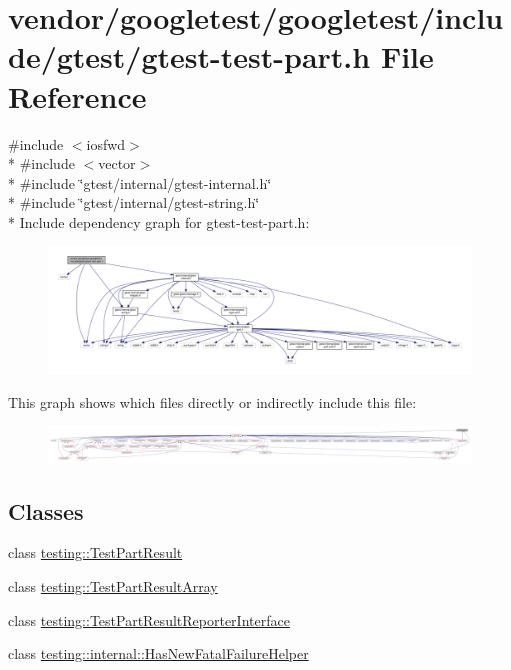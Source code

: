 \hypertarget{gtest-test-part_8h}{}\section{vendor/googletest/googletest/include/gtest/gtest-\/test-\/part.h File Reference}
\label{gtest-test-part_8h}
{\ttfamily \#include $<$iosfwd$>$}\\*
{\ttfamily \#include $<$vector$>$}\\*
{\ttfamily \#include \char`\"{}gtest/internal/gtest-\/internal.\+h\char`\"{}}\\*
{\ttfamily \#include \char`\"{}gtest/internal/gtest-\/string.\+h\char`\"{}}\\*
Include dependency graph for gtest-\/test-\/part.h\+:\nopagebreak
\begin{figure}[H]
\begin{center}
\leavevmode
\includegraphics[width=350pt]{gtest-test-part_8h__incl}
\end{center}
\end{figure}
This graph shows which files directly or indirectly include this file\+:\nopagebreak
\begin{figure}[H]
\begin{center}
\leavevmode
\includegraphics[width=350pt]{gtest-test-part_8h__dep__incl}
\end{center}
\end{figure}
\subsection*{Classes}
\begin{DoxyCompactItemize}
\item 
class \hyperlink{classtesting_1_1TestPartResult}{testing\+::\+Test\+Part\+Result}
\item 
class \hyperlink{classtesting_1_1TestPartResultArray}{testing\+::\+Test\+Part\+Result\+Array}
\item 
class \hyperlink{classtesting_1_1TestPartResultReporterInterface}{testing\+::\+Test\+Part\+Result\+Reporter\+Interface}
\item 
class \hyperlink{classtesting_1_1internal_1_1HasNewFatalFailureHelper}{testing\+::internal\+::\+Has\+New\+Fatal\+Failure\+Helper}
\end{DoxyCompactItemize}

